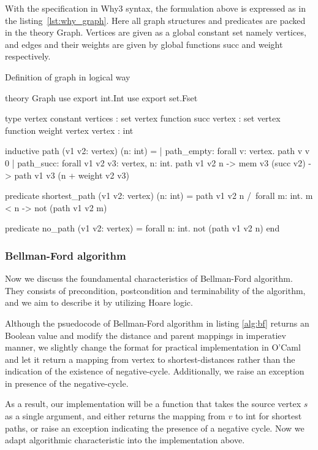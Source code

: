 \documentclass[a4paper,12pt]{article}
\begin{document}
With the specification in Why3 syntax, the formulation above is expressed as in the listing~\ref{lst:why_graph}. Here all graph structures and predicates are packed in the theory \mbox{\sc Graph}. Vertices are given as a global constant set namely \mbox{\sc vertices}, and edges and their weights are given by global functions \mbox{\sc succ} and \mbox{\sc weight} respectively.

\begin{algorithm}
\caption{Definition of graph in logical way}\label{lst:why_graph}
\begin{why3}[1]
theory Graph
  use export int.Int
  use export set.Fset

  type vertex
  constant vertices : set vertex
  function succ vertex : set vertex
  function weight vertex vertex : int

  inductive path (v1 v2: vertex) (n: int) =
    | path_empty:
        forall v: vertex. path v v 0
    | path_succ:
        forall v1 v2 v3: vertex, n: int.
        path v1 v2 n -> mem v3 (succ v2) -> path v1 v3 (n + weight v2 v3)

  predicate shortest_path (v1 v2: vertex) (n: int) =
    path v1 v2 n /\
    forall m: int. m < n -> not (path v1 v2 m)

  predicate no_path (v1 v2: vertex) =
    forall n: int. not (path v1 v2 n)
end
\end{why3}
\end{algorithm}

\subsubsection{Bellman-Ford algorithm}

Now we discuss the foundamental characteristics of Bellman-Ford algorithm. They consists of precondition, postcondition and terminability of the algorithm, and we aim to describe it by utilizing Hoare logic.

Although the psuedocode of Bellman-Ford algorithm in listing \ref{alg:bf} returns an Boolean value and modify the distance and parent mappings in imperatiev manner, we slightly change the format for practical implementation in O'Caml and let it return a mapping from vertex to shortest-distances rather than the indication of the existence of negative-cycle. Additionally, we raise an exception in presence of the negative-cycle.

As a result, our implementation will be a function that takes the source vertex $ s $ as a single argument, and either returns the mapping from $ v $ to \mbox{\sc int} for shortest paths, or raise an exception indicating the presence of a negative cycle. Now we adapt algorithmic characteristic into the implementation above.
\end{document}
